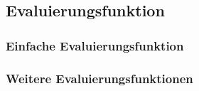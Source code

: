 \subsection{Evaluierungsfunktion}


\subsubsection{Einfache Evaluierungsfunktion}


\subsubsection{Weitere Evaluierungsfunktionen}

